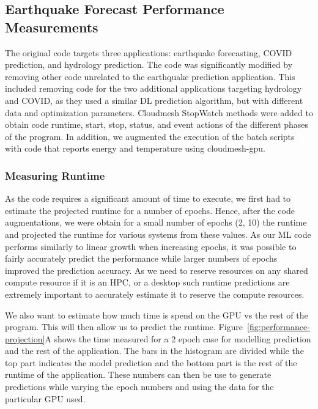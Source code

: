 \documentclass[utf8]{FrontiersinVancouver} %
\newcommand{\TODO}[2]{\todo[inline]{{\bf \color{red} #1} #2}}
\begin{document}

\subsection{Earthquake Forecast Performance Measurements}
\label{sec:perf-main}

The original code targets three applications: earthquake forecasting, COVID prediction, and hydrology prediction.
The code was significantly modified by removing other code unrelated to the earthquake prediction application. This included
removing code for the two additional applications targeting hydrology and COVID, as they used a similar DL prediction algorithm, but with different data and optimization
parameters. Cloudmesh StopWatch methods were added to obtain code
runtime, start, stop, status, and event actions of the different phases of the program. In addition, we
augmented the execution of the batch scripts with code that reports
energy and temperature using cloudmesh-gpu.

\subsubsection{Measuring Runtime}
\label{sec:perf-runtime}

As the code requires a significant amount of time to execute, we first had to estimate the projected runtime for a number of epochs. Hence, after the code augmentations, we were obtain for a small number of epochs (2, 10) the runtime and  projected the runtime for 
various systems from these values. 
As our ML code
performs similarly to linear growth when increasing epochs, it was
possible to fairly accurately predict the performance while larger numbers of epochs improved the prediction accuracy. As we need to reserve resources on any shared compute resource if it is an HPC, or a desktop such runtime predictions are extremely important to accurately estimate it to reserve the compute resources.

We also want to estimate how much time is spend on the GPU vs the rest of the program. This will then allow us to predict the runtime.
Figure~\ref{fig:performance-projection}A shows the time measured for a
2 epoch case for modelling prediction and the rest of the application. The bars in the histogram are divided while the top part indicates the model prediction and the bottom part is the rest of the runtime of the application. These numbers can then be use to generate predictions while varying the epoch numbers and using the data for the particular GPU used.
\end{document}
